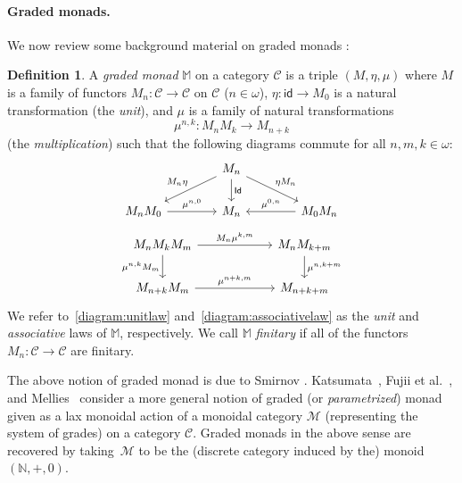 \documentclass[sigconf,
			final%
			nonacm
                        ]{acmart}
\numberwithin{equation}{section}
\numberwithin{equation}{section}
\theoremstyle{plain}
\theoremstyle{definition}
\newtheorem{defn}[thm]{Definition}
\newcommand{\id}{\mathsf{id}}
\newcommand{\M}{\mathbb{M}}                   %
\newcommand{\CatC}{\mathscr{C}}           %
\newcommand{\Set}{\mathbf{Set}}
\newcommand{\Mon}{\mathscr{M}}             %
\newcommand{\N}{\mathds{N}}            %
\newcommand{\Id}{\mathsf{Id}}                 %
\begin{document}
\paragraph*{Graded monads.}
We now review some background material on graded monads
\cite{Smirnov08, MPS15}:
%
\begin{defn}\label{D:gradedmonad}
  A \emph{graded monad} $\M$ on a category $\CatC$ is a triple
  $(M, \eta, \mu)$ where $M$ is a family of functors
  $M_n\colon\CatC\to\CatC$ on $\CatC$ ($n\in\omega$),
  $\eta\colon \id \to M_0$ is a natural transformation (the
  \emph{unit}), and $\mu$ is a family of natural transformations%
  \begin{equation}
    \mu^{n,k}\colon M_nM_k\to M_{n+k}  \tag{$n,k\in\omega$}
  \end{equation}
  (the \emph{multiplication}) such that the following diagrams commute
  for all $n,m,k\in\omega$:
  \begin{equation}\label{diagram:unitlaw}
    \begin{tikzcd}[column sep=40]
      &
      M_n
      \arrow[ld, "M_n\eta"'] \arrow[rd, "\eta M_n"]  \arrow[d, "\Id"]
      \\
      M_nM_0
      \arrow[r, "{\mu^{n,0}}"]
      &
      M_n
      &
      M_0M_n \arrow[l, "{\mu^{0,n}}"']
    \end{tikzcd}
  \end{equation}
  \begin{equation}\label{diagram:associativelaw}
    \begin{tikzcd}[column sep = 60]
      M_nM_kM_m
      \arrow[r, "{M_n\mu^{k,m}}"]
      \arrow[d, "{\mu^{n,k}M_m}"']
      &
      M_{n}M_{k+m} \arrow[d, "{\mu^{n,k+m}}"]
      \\
      M_{n+k}M_m \arrow[r, "{\mu^{n+k,m}}"]
      &
      M_{n+k+m}
    \end{tikzcd}
  \end{equation}
  We refer to~\eqref{diagram:unitlaw} and~\eqref{diagram:associativelaw}
  as the \emph{unit} and \emph{associative} laws of $\M$,
  respectively. We call $\M$ \emph{finitary} if all of the
  functors $M_n\colon\CatC\to\CatC$ are finitary.
\end{defn}
\noindent
The above notion of graded monad is due to Smirnov \cite{Smirnov08}.
Katsumata~\cite{Katsumata14}, Fujii et al.~\cite{FKM16}, and
Mellies~\cite{Mellies17} consider a more general notion of graded (or
\emph{parametrized}) monad given as a lax monoidal action of a
monoidal category $\Mon$ (representing the system of grades) on a
category $\CatC$. Graded monads in the above sense are recovered by
taking~$\Mon$ to be the (discrete category induced by the) monoid
$(\N, +, 0)$.
\end{document}
